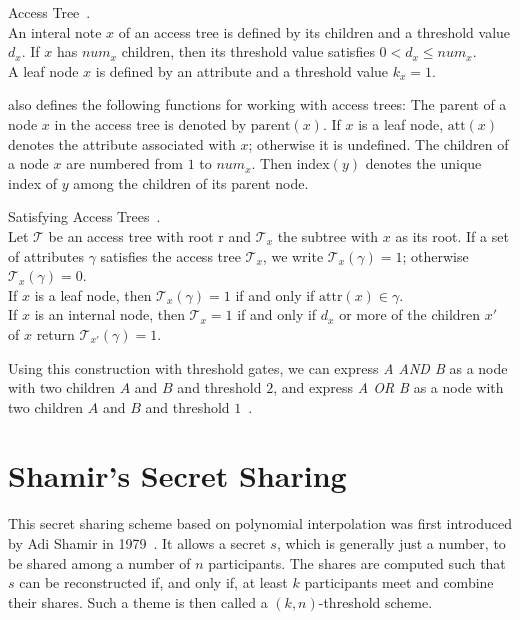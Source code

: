 \begin{definition}
    Access Tree~\cite{goyal_attribute-based_2006}.\\
    An interal note $x$ of an access tree is defined by its children and a threshold value $d_x$. If $x$ has $num_x$ children, then its threshold value satisfies $0 < d_x \leq num_x$.\\
    A leaf node $x$ is defined by an attribute and a threshold value $k_x = 1$.

    \cite{goyal_attribute-based_2006} also defines the following functions for working with access trees:
    The parent of a node $x$ in the access tree is denoted by $\text{parent}(x)$.
    If $x$ is a leaf node, $\text{att}(x)$ denotes the attribute associated with $x$; otherwise it is undefined.
    The children of a node $x$ are numbered from $1$ to $num_x$. Then $\text{index}(y)$ denotes the unique index of $y$ among the children of its parent node.
\end{definition}

\begin{definition}
    Satisfying Access Trees~\cite{goyal_attribute-based_2006}.\\
    Let $\mathcal{T}$ be an access tree with root r and $\mathcal{T}_x$ the subtree with $x$ as its root.
    If a set of attributes $\gamma$ satisfies the access tree $\mathcal{T}_x$, we write $\mathcal{T}_x(\gamma) = 1$; otherwise $\mathcal{T}_x(\gamma) = 0$.\\
    If $x$ is a leaf node, then $\mathcal{T}_x(\gamma) = 1$ if and only if $\text{attr}(x) \in \gamma$.\\
    If $x$ is an internal node, then $\mathcal{T}_x = 1$ if and only if $d_x$ or more of the children $x'$ of $x$ return $\mathcal{T}_{x'}(\gamma) = 1$.
\end{definition}

Using this construction with threshold gates, we can express \emph{A AND B} as a node with two children $A$ and $B$ and threshold $2$, and express \emph{A OR B} as a node with two children $A$ and $B$ and threshold $1$~\cite{yao_lightweight_2015}.

\section{Shamir's Secret Sharing}
This secret sharing scheme based on polynomial interpolation was first introduced by Adi Shamir in 1979~\cite{shamir_how_1979}.
It allows a secret $s$, which is generally just a number, to be shared among a number of $n$ participants.
The shares are computed such that $s$ can be reconstructed if, and only if, at least $k$ participants meet and combine their shares.
Such a theme is then called a $(k,n)$-threshold scheme.~\cite{shamir_how_1979}

